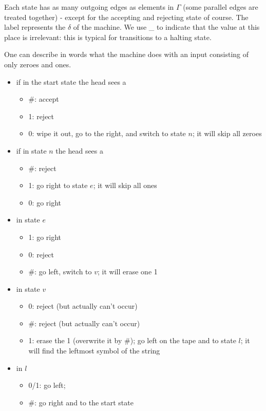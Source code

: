 Each state has as many outgoing edges as elements in $\Gamma$ (some
parallel edges are treated together) - except for the accepting and rejecting
state of course. The label represents the $\delta$ of the machine. We
use \_ to indicate that the value at this place is irrelevant: this is
typical for transitions to a halting state.



One can describe in words what the machine does with an input
consisting of only zeroes and ones.

\begin{itemize}
\item if in the start state the head sees a
\begin{itemize}
\item \#: accept
\item 1: reject
\item 0: wipe it out, go to the right, and switch to state $n$; it
  will skip all zeroes
\end{itemize}

\item if in state $n$ the head sees a
\begin{itemize}
\item \#: reject
\item 1: go right to state $e$; it will skip all ones
\item 0: go right
\end{itemize}


\item in state $e$
\begin{itemize}
\item 1: go right
\item 0: reject
\item \#: go left, switch to $v$; it will erase one 1
\end{itemize}

\item in state $v$
\begin{itemize}
\item 0: reject (but actually can't occur)
\item \#: reject (but actually can't occur)
\item 1: erase the 1 (overwrite it by \#); go left on the tape and to
  state $l$; it will find the leftmost symbol of the string
\end{itemize}

\item in $l$
\begin{itemize}
\item 0/1: go left;
\item \#: go right and to the start state
\end{itemize}

\end{itemize}

